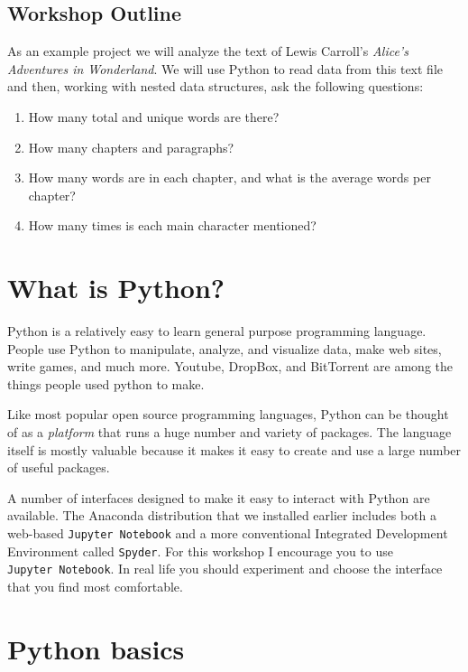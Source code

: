 \documentclass[]{book}
\providecommand{\tightlist}{%
  \setlength{\itemsep}{0pt}\setlength{\parskip}{0pt}}
\begin{document}
\hypertarget{workshop-outline-3}{%
\subsection{Workshop Outline}\label{workshop-outline-3}}

As an example project we will analyze the text of Lewis Carroll's \emph{Alice's Adventures in Wonderland}.
We will use Python to read data from this text file and then, working with nested data structures, ask the following questions:

\begin{enumerate}
\def\labelenumi{\arabic{enumi}.}
\tightlist
\item
  How many total and unique words are there?
\item
  How many chapters and paragraphs?
\item
  How many words are in each chapter, and what is the average words per chapter?
\item
  How many times is each main character mentioned?
\end{enumerate}

\hypertarget{what-is-python}{%
\section{What is Python?}\label{what-is-python}}

Python is a relatively easy to learn general purpose programming language. People use Python to manipulate, analyze, and visualize data, make web sites, write games, and much more. Youtube, DropBox, and BitTorrent are among the things people used python to make.

Like most popular open source programming languages, Python can be thought of as a \emph{platform} that runs a huge number and variety of packages. The language itself is mostly valuable because it makes it easy to create and use a large number of useful packages.

A number of interfaces designed to make it easy to interact with Python are available. The Anaconda distribution that we installed earlier includes both a web-based \texttt{Jupyter\ Notebook} and a more conventional Integrated Development Environment called \texttt{Spyder}. For this workshop I encourage you to use \texttt{Jupyter\ Notebook}. In real life you should experiment and choose the interface that you find most comfortable.

\hypertarget{python-basics}{%
\section{Python basics}\label{python-basics}}
\end{document}
